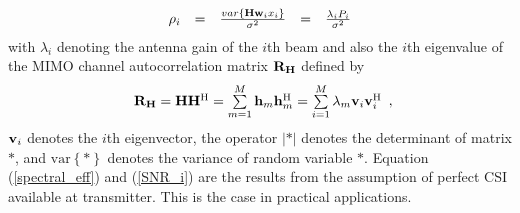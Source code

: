 \documentclass[10pt,fleqn, twocolumn]{IEEEtran}
\newcommand{\bh}{{\bf h}}
\newcommand{\bH}{{\bf H}}
\newcommand{\bv}{{\bf v}}
\newcommand{\bw}{{\bf w}}
\newcommand{\bR}{{\bf R}}
\begin{document}
\begin{equation}
\begin{array}{rcccl}
\rho_{i}&=&\frac{\mbox{var}\left\{\bH\bw_{i}x_{i}\right\}}{\sigma^2}&=&\frac{\lambda_{i}P_{i}}{\sigma^2}
\end{array}\label{SNR_i}
\end{equation}
\noindent with $\lambda_{i}$ denoting the antenna gain of the
$i$th beam and also the $i$th eigenvalue of the MIMO channel
autocorrelation matrix $\bR_{\bH}$ defined by
\begin{equation}
\begin{array}{l}
\bR_{\bH}=\bH\bH^{\rm H}=\sum\limits_{m=1}^{M}\bh_{m}\bh_{m}^{\rm
H}=\sum\limits_{i=1}^{M}\lambda_{m}\bv_{i}\bv_{i}^{\rm H}
\end{array},\label{R_h}
\end{equation}
\noindent $\bv_{i}$ denotes the $i$th eigenvector, the operator
$\left|\ast\right|$ denotes the determinant of matrix $\ast$, and
$\mbox{var}\left\{\ast\right\}$ denotes the variance of random
variable $\ast$. Equation (\ref{spectral_eff}) and (\ref{SNR_i})
are the results from the assumption of perfect CSI available at
transmitter. This is the case in practical applications.
\end{document}
